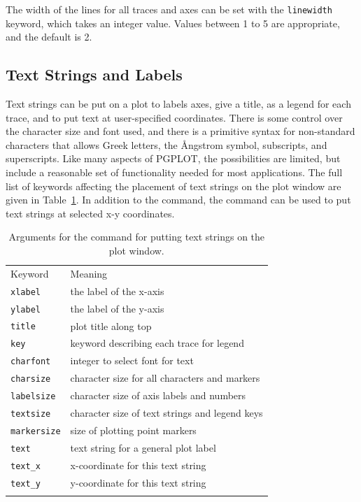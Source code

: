 The width of the lines for all traces and axes can be set with the
{\texttt{linewidth}} keyword, which takes an integer value.  Values between
1 to 5 are appropriate, and the default is 2.
{


\subsection{Text Strings and Labels} \label{Ch:Plot-Text}
{}

Text strings can be put on a plot to labels axes, give a title, as a legend
for each trace, and to put text at user-specified coordinates.  There is
some control over the character size and font used, and there is a
primitive syntax for non-standard characters that allows Greek letters, the
{\AA}ngstrom symbol, subscripts, and superscripts.  Like many aspects of
PGPLOT, the possibilities are limited, but include a reasonable set of
functionality needed for most applications.  The full list of {}
keywords affecting the placement of text strings on the plot window are
given in Table~\ref{Table:plot_strings}.  In addition to the {}
command, the {} command can be used to put text strings at
selected x-y coordinates.


\begin{table}[tb]
\begin{center}
\caption[a]{Arguments for the  {} command  for putting text
  strings on the plot window.}
{\label{Table:plot_strings}}
  \begin{tabular}{ll}
    \noalign{\smallskip}
    Keyword & Meaning   \\
      \noalign{\smallskip}    \hline    \noalign{\smallskip}
     {\tt{{xlabel}}}     & the label of the x-axis \\
     {\tt{{ylabel}}}     & the label of the y-axis \\
     {\tt{{title}}}      & plot title along top \\
     {\tt{{key}}}        & keyword describing each trace for legend\\
     {\tt{{charfont}}}   & integer to select font for text \\
     {\tt{{charsize}}}   & character size for all characters and markers \\
     {\tt{{labelsize}}}  & character size of axis labels and numbers \\
     {\tt{{textsize}}}   & character size of text strings and legend keys \\
     {\tt{{markersize}}} & size of plotting point markers \\
     {\tt{{text}}}       & text string for a general plot label\\
     {\tt{{text\_x}}}    & x-coordinate for this text string \\
     {\tt{{text\_y}}}    & y-coordinate for this text string \\
    \noalign{\smallskip}   \hline
  \end{tabular}
\end{center}
\end{table}
\noindent

}
